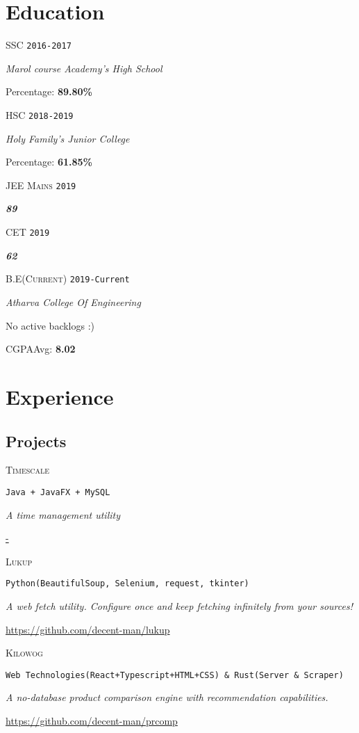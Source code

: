 \documentclass{article}
\newcommand{\school}{Marol course Academy's High School}
\newcommand{\hischool}{Holy Family's Junior College}
\newcommand{\college}{Atharva College Of Engineering}
\newcommand{\course}[6]{
	\begin{minipage}[t]{.15\textwidth}
		\hfill \large \textsc{#1}\hspace{1cm}\linebreak[4]
		\vspace{1cm}
		\hfill \footnotesize \texttt{#2}
	\end{minipage}
	\hfill\vline\hfill
	\begin{minipage}[t]{.80\textwidth}
		\large \textsl{#3}

		#6
		
		#4: \textbf{#5}
	\end{minipage}
}
\newcommand{\currentsep}{
	\begin{center}
		\dotfill
	\end{center}
}
\newcommand{\entrance}[3]{
	\begin{minipage}[t]{.15\textwidth}
		\hfill \large \textsc{#1}\hspace{1cm}\linebreak[4]
		\vspace{1cm}
		\hfill \footnotesize \texttt{#2}
	\end{minipage}
	\hfill\vline\hfill
	\begin{minipage}[t]{.80\textwidth}
		\textsl{\textbf{#3}}
	\end{minipage}
}
\newcommand{\project}[4]{
	\begin{minipage}[t]{.15\textwidth}
		\hfill \textsc{#1}
	\end{minipage}
	\hfill\vline\hfill
	\begin{minipage}[t]{.80\textwidth}

		\texttt{#2}

		\textsl{#3}

		\url{#4}

		\dotfill
	\end{minipage}
}
\begin{document}
	\section{Education}
		\course{SSC}
			{2016-2017} 
			{\school}
			{Percentage}
			{89.80\%}
			{}
		\course{HSC}
			{2018-2019} 
			{\hischool}
			{Percentage}
			{61.85\%}
			{}
		\entrance{JEE Mains}{2019}{89}
		\entrance{CET}{2019}{62}
		\currentsep
		\course{B.E\scriptsize(Current)}
			{2019-Current}
			{\college}
			{CGPA\scriptsize Avg\large}
			{8.02}
			{No active backlogs :)}
		\currentsep
	\section{Experience}
		\subsection{Projects}
				\project{Timescale}
				{Java + JavaFX + MySQL}
				{A time management utility}
				{-}
				\project{Lukup}
				{Python(BeautifulSoup, Selenium, request, tkinter)}
				{A web fetch utility. \footnotesize Configure once and keep fetching infinitely from your sources!}
				{https://github.com/decent-man/lukup}
				\project{Kilowog}
				{Web Technologies(React+Typescript+HTML+CSS) \& Rust(Server \& Scraper)}
				{A no-database product comparison engine with recommendation capabilities.}
				{https://github.com/decent-man/prcomp}
\end{document}
